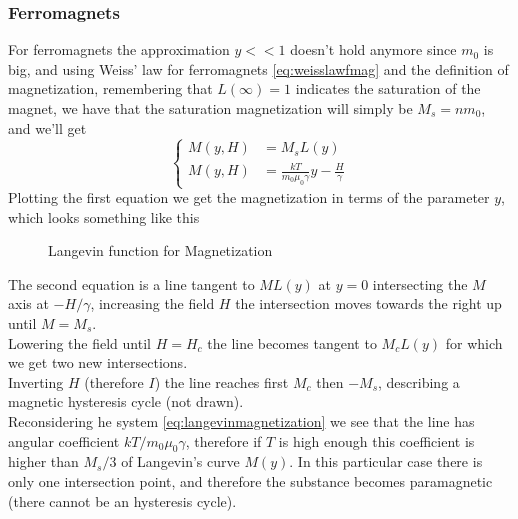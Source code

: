 \documentclass[../electromagnetism.tex]{subfiles}
\begin{document}
\subsubsection{Ferromagnets}
For ferromagnets the approximation $y<<1$ doesn't hold anymore since $m_0$ is big, and using Weiss' law for ferromagnets \eqref{eq:weisslawfmag} and the definition of magnetization, remembering that $L(\infty)=1$ indicates the saturation of the magnet, we have that the saturation magnetization will simply be $M_s=nm_0$, and we'll get
\begin{equation}
	\left\{ \begin{aligned}
			M(y,H)&=M_sL(y)\\
			M(y,H)&=\frac{kT}{m_0\mu_0\gamma}y-\frac{H}{\gamma}
	\end{aligned}\right.
	\label{eq:langevinmagnetization}
\end{equation}
Plotting the first equation we get the magnetization in terms of the parameter $y$, which looks something like this
\begin{figure}[H]
	\centering
	\caption{Langevin function for Magnetization}
	\label{fig:langevinfunc}
\end{figure}
The second equation is a line tangent to $ML(y)$ at $y=0$ intersecting the $M$ axis at $-H/\gamma$, increasing the field $H$ the intersection moves towards the right up until $M=M_s$.\\
Lowering the field until $H=H_c$ the line becomes tangent to $M_cL(y)$ for which we get two new intersections.\\
Inverting $H$ (therefore $I$) the line reaches first $M_c$ then $-M_s$, describing a magnetic hysteresis cycle (not drawn).\\
Reconsidering he system \eqref{eq:langevinmagnetization} we see that the line has angular coefficient $kT/m_0\mu_0\gamma$, therefore if $T$ is high enough this coefficient is higher than $M_s/3$ of Langevin's curve $M(y)$. In this particular case there is only one intersection point, and therefore the substance becomes paramagnetic (there cannot be an hysteresis cycle).\\
\end{document}
